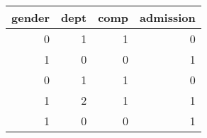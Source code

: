 \begin{tabular}{rrrr}
\toprule
 gender &  dept &  comp &  admission \\
\midrule
      0 &     1 &     1 &          0 \\
      1 &     0 &     0 &          1 \\
      0 &     1 &     1 &          0 \\
      1 &     2 &     1 &          1 \\
      1 &     0 &     0 &          1 \\
\bottomrule
\end{tabular}
